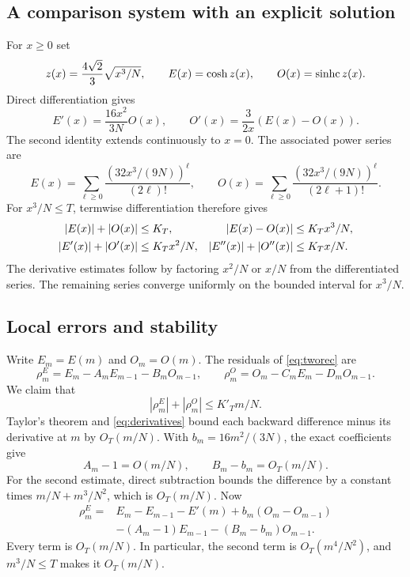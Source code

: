 \subsection{A comparison system with an explicit solution}

For $x\ge0$ set
\[
z(x)=\frac{4\sqrt2}{3}\sqrt{x^3/N},\qquad
E(x)=\cosh z(x),\qquad O(x)=\operatorname{sinhc} z(x).
\]
Direct differentiation gives
\begin{equation}\label{eq:ode}
E'(x)=\frac{16x^2}{3N}O(x),\qquad
O'(x)=\frac3{2x}(E(x)-O(x)).
\end{equation}
The second identity extends continuously to $x=0$. The associated power series are
\[
E(x)=\sum_{\ell\ge0}\frac{(32x^3/(9N))^\ell}{(2\ell)!},\qquad
O(x)=\sum_{\ell\ge0}\frac{(32x^3/(9N))^\ell}{(2\ell+1)!}.
\]
For $x^3/N\le T$, termwise differentiation therefore gives
\begin{align}
|E(x)|+|O(x)|&\le K_T,&
|E(x)-O(x)|&\le K_Tx^3/N,\notag\\
|E'(x)|+|O'(x)|&\le K_Tx^2/N,&
|E''(x)|+|O''(x)|&\le K_Tx/N.\label{eq:derivatives}
\end{align}
The derivative estimates follow by factoring $x^2/N$ or $x/N$ from the differentiated series. The remaining series converge uniformly on the bounded interval for $x^3/N$.

\subsection{Local errors and stability}

Write $E_m=E(m)$ and $O_m=O(m)$. The residuals of \eqref{eq:tworec} are
\[
\rho_m^E=E_m-A_mE_{m-1}-B_mO_{m-1},\qquad
\rho_m^O=O_m-C_mE_m-D_mO_{m-1}.
\]
We claim that
\begin{equation}\label{eq:residual}
|\rho_m^E|+|\rho_m^O|\le K'_Tm/N.
\end{equation}
Taylor's theorem and \eqref{eq:derivatives} bound each backward difference minus its derivative at $m$ by $O_T(m/N)$. With $b_m=16m^2/(3N)$, the exact coefficients give
\[
A_m-1=O(m/N),\qquad B_m-b_m=O_T(m/N).
\]
For the second estimate, direct subtraction bounds the difference by a constant times $m/N+m^3/N^2$, which is $O_T(m/N)$. Now
\begin{align*}
\rho_m^E={}&E_m-E_{m-1}-E'(m)+b_m(O_m-O_{m-1})\\
&-(A_m-1)E_{m-1}-(B_m-b_m)O_{m-1}.
\end{align*}
Every term is $O_T(m/N)$. In particular, the second term is $O_T(m^4/N^2)$, and $m^3/N\le T$ makes it $O_T(m/N)$.

